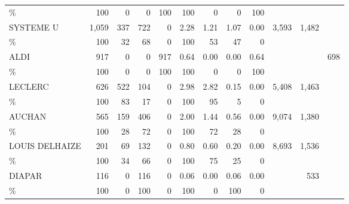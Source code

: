 \documentclass[11pt]{article}
\begin{document}
\begin{table}[H]
\begin{tabular}{l|rrrr|rrrr|rrr}
\%             &        100 &          0 &          0 &        100 &        100 &          0 &          0 &        100 &            &            &            \\
SYSTEME U      &      1,059 &        337 &        722 &          0 &       2.28 &       1.21 &       1.07 &       0.00 &      3,593 &      1,482 &            \\
\%             &        100 &         32 &         68 &          0 &        100 &         53 &         47 &          0 &            &            &            \\
ALDI           &        917 &          0 &          0 &        917 &       0.64 &       0.00 &       0.00 &       0.64 &            &            &        698 \\
\%             &        100 &          0 &          0 &        100 &        100 &          0 &          0 &        100 &            &            &            \\
LECLERC        &        626 &        522 &        104 &          0 &       2.98 &       2.82 &       0.15 &       0.00 &      5,408 &      1,463 &            \\
\%             &        100 &         83 &         17 &          0 &        100 &         95 &          5 &          0 &            &            &            \\
AUCHAN         &        565 &        159 &        406 &          0 &       2.00 &       1.44 &       0.56 &       0.00 &      9,074 &      1,380 &            \\
\%             &        100 &         28 &         72 &          0 &        100 &         72 &         28 &          0 &            &            &            \\
LOUIS DELHAIZE &        201 &         69 &        132 &          0 &       0.80 &       0.60 &       0.20 &       0.00 &      8,693 &      1,536 &            \\
\%             &        100 &         34 &         66 &          0 &        100 &         75 &         25 &          0 &            &            &            \\
DIAPAR         &        116 &          0 &        116 &          0 &       0.06 &       0.00 &       0.06 &       0.00 &            &        533 &            \\
\%             &        100 &          0 &        100 &          0 &        100 &          0 &        100 &          0 &            &            &            \\

\end{tabular}
\end{table}
\end{document}
